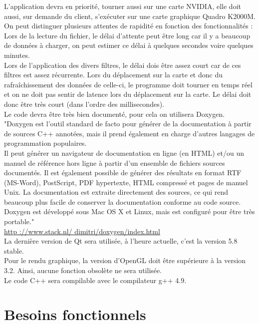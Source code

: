 \documentclass[12pt]{article}
\begin{document}
		L’application devra en priorité, tourner aussi sur une carte NVIDIA, elle doit aussi,
		sur demande du client, s’exécuter sur une carte graphique Quadro K2000M.\\
		
		On peut distinguer plusieurs attentes de rapidité en fonction des fonctionnalités :
		Lors de la lecture du fichier, le délai d’attente peut être long car il y a
		beaucoup de données à charger, on peut estimer ce délai à quelques secondes voire
		quelques minutes. \\
		
		Lors de l’application des divers filtres, le délai dois être assez court car 
		de ces filtres est assez récurrente.
		Lors du déplacement sur la carte et donc du rafraîchissement des données de celle-ci,
		le programme doit tourner en temps réel et on ne doit pas sentir de latence lors du
		déplacement sur la carte. Le délai doit donc être très court (dans l’ordre des
		millisecondes).\\
		Le code devra être très bien documenté, pour cela on utilisera Doxygen.
		"Doxygen est l’outil standard de facto pour générer de la documentation à partir de
		sources C++ annotées, mais il prend également en charge d’autres langages de
		programmation populaires.\\
		Il peut générer un navigateur de documentation en ligne (en HTML) et/ou un manuel de
		référence hors ligne à partir d’un ensemble de fichiers sources documentés. Il est
		également possible de générer des résultats en format RTF (MS-Word), PostScript,
		PDF hypertexte, HTML compressé et pages de manuel Unix. La documentation est 
		extraite directement des sources, ce qui rend beaucoup plus facile de conserver
		la documentation conforme au code source. \\
		Doxygen est développé sous Mac OS X et Linux, mais est configuré pour être très
		portable."\\
		
		\url{http ://www.stack.nl/ dimitri/doxygen/index.html} \\
		
		La dernière version de Qt sera utilisée, à l’heure actuelle, c’est la version
		5.8 stable.\\
		Pour le rendu graphique, la version d’OpenGL doit être supérieure à la version 3.2.
		Ainsi, aucune fonction obsolète ne sera utilisée.\\
		Le code C++ sera compilable avec le compilateur g++ 4.9.
		

	\section{Besoins fonctionnels}
\end{document}
